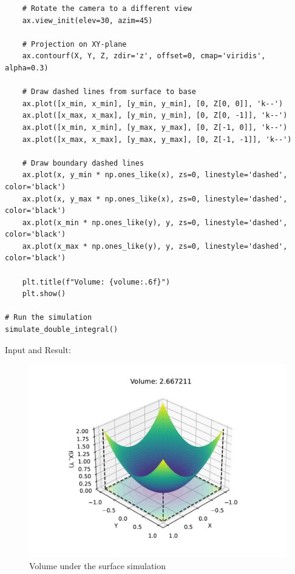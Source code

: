 \documentclass[13pt,a4paper]{report}
\begin{document}
\begin{verbatim}
    # Rotate the camera to a different view
    ax.view_init(elev=30, azim=45) 

    # Projection on XY-plane
    ax.contourf(X, Y, Z, zdir='z', offset=0, cmap='viridis', alpha=0.3)

    # Draw dashed lines from surface to base
    ax.plot([x_min, x_min], [y_min, y_min], [0, Z[0, 0]], 'k--')
    ax.plot([x_max, x_max], [y_min, y_min], [0, Z[0, -1]], 'k--')
    ax.plot([x_min, x_min], [y_max, y_max], [0, Z[-1, 0]], 'k--')
    ax.plot([x_max, x_max], [y_max, y_max], [0, Z[-1, -1]], 'k--')

    # Draw boundary dashed lines
    ax.plot(x, y_min * np.ones_like(x), zs=0, linestyle='dashed', color='black')
    ax.plot(x, y_max * np.ones_like(x), zs=0, linestyle='dashed', color='black')
    ax.plot(x_min * np.ones_like(y), y, zs=0, linestyle='dashed', color='black')
    ax.plot(x_max * np.ones_like(y), y, zs=0, linestyle='dashed', color='black')

    plt.title(f"Volume: {volume:.6f}")
    plt.show()

# Run the simulation
simulate_double_integral()
\end{verbatim}

Input and Result:\\[-0.35cm]
\begin{center}
\begin{figure}[H]
\centering
\includegraphics[trim={0.5cm 1cm 0 0.35cm},clip]{pdfs/double_integral.pdf}
\caption{Volume under the surface simulation}
\end{figure}
\end{center}
\end{document}
